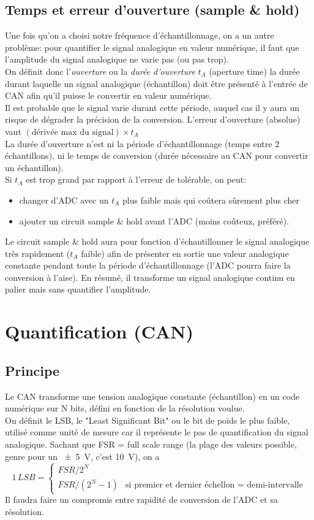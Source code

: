 \subsection{Temps et erreur d'ouverture (sample \& hold)}
Une fois qu'on a choisi notre fréquence d'échantillonnage, on a un autre problème: pour quantifier le signal analogique en valeur numérique, il faut que l'amplitude du signal analogique ne varie pas (ou pas trop).\\
On définit donc l'\emph{ouverture} ou la \emph{durée d'ouverture} \(t_A\) (aperture time) la durée durant laquelle un signal analogique (échantillon) doit être présenté à l'entrée de CAN afin qu'il puisse le convertir en valeur numérique.\\
Il est probable que le signal varie durant cette période, auquel cas il y aura un risque de dégrader la précision de la conversion. L'erreur d'ouverture (absolue) vaut \((\text{dérivée max du signal})\times t_A\)\\

\danger La durée d'ouverture n'est ni la période d'échantillonnage (temps entre 2 échantillons), ni le temps de conversion (durée nécessaire au CAN pour convertir un échantillon).\\

Si \(t_A\) est trop grand par rapport à l'erreur de tolérable, on peut:
\begin{itemize}
	\item changer d'ADC avec un \(t_A\) plus faible mais qui coûtera sûrement plus cher
	\item ajouter un circuit sample \& hold avant l'ADC (moins coûteux, préféré).
\end{itemize}
Le circuit sample \& hold aura pour fonction d'échantillonner le signal analogique très rapidement (\(t_A\) faible) afin de présenter en sortie une valeur analogique constante pendant toute la période d'échantillonnage (l'ADC pourra faire la conversion à l'aise). En résumé, il transforme un signal analogique continu en palier mais sans quantifier l'amplitude.
\section{Quantification (CAN)}
\subsection{Principe}
Le CAN transforme une tension analogique constante (échantillon) en un code numérique sur N bits, défini en fonction de la résolution voulue.\\
On définit le LSB, le "Least Significant Bit" ou le bit de poids le plus faible, utilisé comme unité de mesure car il représente le pas de quantification du signal analogique. Sachant que FSR = full scale range (la plage des valeurs possible, genre pour un \SI{+-5}{\volt}, c'est \SI{10}{\volt}), on a
\[1\,LSB = \left\{\begin{array}{lc}
FSR/2^{N}\\
FSR/(2^N-1) & \text{si premier et dernier échellon = demi-intervalle}
\end{array}\right.\]
Il faudra faire un compromis entre rapidité de conversion de l'ADC et sa résolution.
